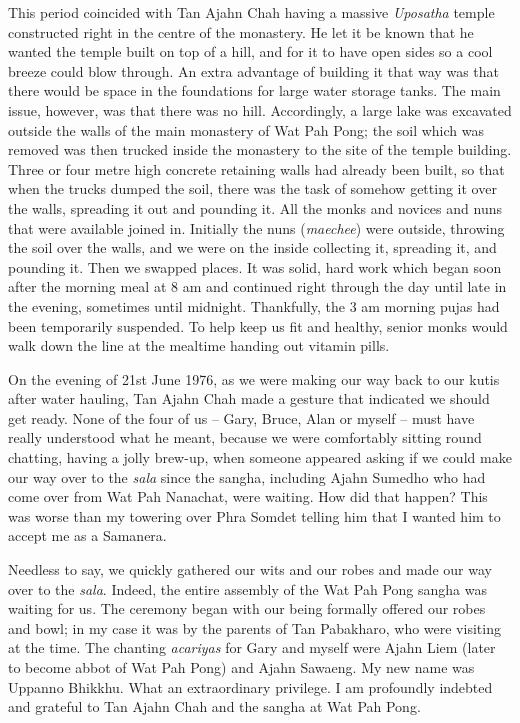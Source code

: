 This period coincided with Tan Ajahn Chah having a massive
\emph{Uposatha} temple constructed right in the centre of the monastery.
He let it be known that he wanted the temple built on top of a hill, and
for it to have open sides so a cool breeze could blow through. An extra
advantage of building it that way was that there would be space in the
foundations for large water storage tanks. The main issue, however, was
that there was no hill. Accordingly, a large lake was excavated outside
the walls of the main monastery of Wat Pah Pong; the soil which was
removed was then trucked inside the monastery to the site of the temple
building. Three or four metre high concrete retaining walls had already
been built, so that when the trucks dumped the soil, there was the task
of somehow getting it over the walls, spreading it out and pounding it.
All the monks and novices and nuns that were available joined in.
Initially the nuns (\emph{maechee}) were outside, throwing the soil over
the walls, and we were on the inside collecting it, spreading it, and
pounding it. Then we swapped places. It was solid, hard work which began
soon after the morning meal at 8 am and continued right through the day
until late in the evening, sometimes until midnight. Thankfully, the 3
am morning pujas had been temporarily suspended. To help keep us fit and
healthy, senior monks would walk down the line at the mealtime handing
out vitamin pills.

On the evening of 21st June 1976, as we were making our way back to our
kutis after water hauling, Tan Ajahn Chah made a gesture that indicated
we should get ready. None of the four of us -- Gary, Bruce, Alan or
myself -- must have really understood what he meant, because we were
comfortably sitting round chatting, having a jolly brew-up, when someone
appeared asking if we could make our way over to the \emph{sala} since
the sangha, including Ajahn Sumedho who had come over from Wat Pah
Nanachat, were waiting. How did that happen? This was worse than my
towering over Phra Somdet telling him that I wanted him to accept me as
a Samanera.

Needless to say, we quickly gathered our wits and our robes and made our
way over to the \emph{sala}. Indeed, the entire assembly of the Wat Pah
Pong sangha was waiting for us. The ceremony began with our being
formally offered our robes and bowl; in my case it was by the parents of
Tan Pabakharo, who were visiting at the time. The chanting
\emph{acariyas} for Gary and myself were Ajahn Liem (later to become
abbot of Wat Pah Pong) and Ajahn Sawaeng. My new name was Uppanno
Bhikkhu. What an extraordinary privilege. I am profoundly indebted and
grateful to Tan Ajahn Chah and the sangha at Wat Pah Pong.

